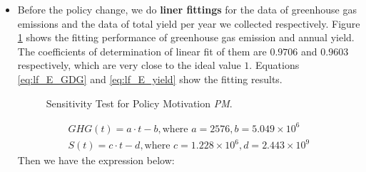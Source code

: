 \documentclass[12pt]{article}
\begin{document}
\begin{itemize}
    \item Before the policy change, we do \textbf{liner fittings} for the data of greenhouse gas emissions and the data of total yield per year we collected respectively. Figure \ref{fig:lf_E_yield_GHG} shows the fitting performance of greenhouse gas emission and annual yield. The coefficients of determination of linear fit of them are $0.9706$ and $0.9603$ respectively, which are very close to the ideal value $1$. Equations \eqref{eq:lf_E_GDG} and \eqref{eq:lf_E_yield} show the fitting results.
    \begin{figure}[htbp]
        \centering
        \caption{Sensitivity Test for Policy Motivation \textit{PM}.\label{fig:lf_E_yield_GHG}}
    	\vspace{0.2in}
    \end{figure}
    \begin{gather}
        GHG(t) = a\cdot t - b, \text{where } a = 2576, b = 5.049\times10^6 \label{eq:lf_E_GDG}\\
        S(t) = c\cdot t - d, \text{where } c = 1.228\times10^6, d = 2.443\times10^9 \label{eq:lf_E_yield}
    \end{gather}
    Then we have the expression below:
    

\end{itemize}
\end{document}
